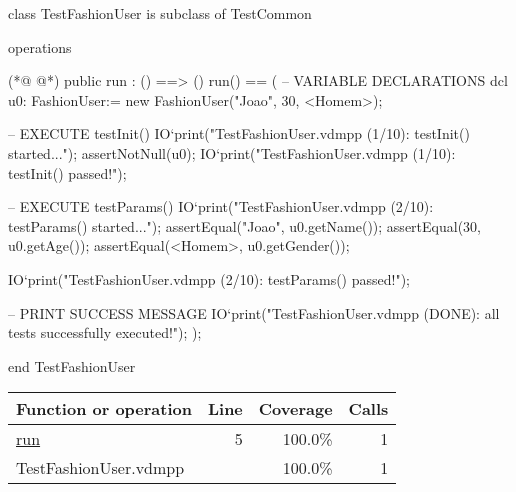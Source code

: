 \begin{vdmpp}[breaklines=true]
class TestFashionUser is subclass of TestCommon

operations

(*@
\label{run:5}
@*)
  public run : () ==> ()
  run() ==
  (
    -- VARIABLE DECLARATIONS
    dcl u0: FashionUser:= new FashionUser("Joao", 30, <Homem>);
    
    -- EXECUTE testInit()
    IO`print("TestFashionUser.vdmpp (1/10): testInit() started...\n");
    assertNotNull(u0);
    IO`print("TestFashionUser.vdmpp (1/10): testInit() passed!\n");

   -- EXECUTE testParams()
    IO`print("TestFashionUser.vdmpp (2/10): testParams() started...\n");
    assertEqual("Joao", u0.getName());
    assertEqual(30, u0.getAge());    
    assertEqual(<Homem>, u0.getGender());
    
    IO`print("TestFashionUser.vdmpp (2/10): testParams() passed!\n");
      
    -- PRINT SUCCESS MESSAGE
    IO`print("TestFashionUser.vdmpp (DONE): all tests successfully executed!\n");
  );

end TestFashionUser
\end{vdmpp}
\bigskip
\begin{longtable}{|l|r|r|r|}
\hline
Function or operation & Line & Coverage & Calls \\
\hline
\hline
\hyperref[run:5]{run} & 5&100.0\% & 1 \\
\hline
\hline
TestFashionUser.vdmpp & & 100.0\% & 1 \\
\hline
\end{longtable}

